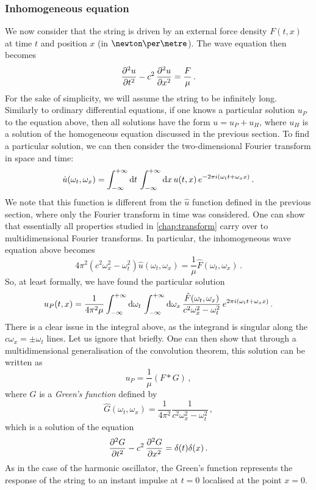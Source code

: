 \subsubsection{Inhomogeneous equation}
We now consider that the string is driven by an external force density $F(t,x)$ at time
$t$ and position $x$ (in $\newton\per\metre$). The wave equation then becomes
\begin{equation}
  \frac{\partial^{2} u}{\partial t^{2}}-c^2\,\frac{\partial^{2} u}{\partial x^{2}}=\frac{F}{\mu}\,.
\end{equation}
For the sake of simplicity, we will assume the string to be infinitely long.
Similarly to ordinary differential equations, if one knows a particular solution $u_P$ to
the equation above, then all solutions have the form $u=u_P+u_H$, where $u_H$ is a
solution of the homogeneous equation discussed in the previous section. To find a
particular solution, we can then consider the two-dimensional Fourier transform in space
and time:
\begin{equation}
  \hat{u}(\omega_t,\omega_x)=\int_{-\infty}^{+\infty}\mathrm{d}{t}\,\int_{-\infty}^{+\infty}\mathrm{d}{x}\,
  u(t,x)\,e^{-2\pi i (\omega_tt+\omega_xx)}\,.
\end{equation}
We note that this function is different from the $\hat{u}$ function defined in the
previous section, where only the Fourier transform in time was considered. One can show
that essentially all properties studied in \cref{chap:transform} carry over to
multidimensional Fourier transforms. In particular, the inhomogeneous wave equation above
becomes
\begin{equation}
  4\pi^2(c^2\omega_x^2-\omega_t^2)\hat{u}(\omega_t,\omega_x)=\frac{1}{\mu}
  \hat{F}(\omega_t,\omega_x)\,.
\end{equation}
So, at least formally, we have found the particular solution
\begin{equation}
  u_P(t,x)=\frac{1}{4\pi^2\mu}\int_{-\infty}^{+\infty}\mathrm{d}{\omega_t}\,\int_{-\infty}^{+\infty}\mathrm{d}{\omega_x}\,
  \frac{\hat{F}(\omega_t,\omega_x)}{c^2\omega_x^2-\omega_t^2}
  \,e^{2\pi i (\omega_tt+\omega_xx)}\,.\label{eq:wave-eq-up}
\end{equation}
There is a clear issue in the integral above, as the integrand is singular along the
$c\omega_x=\pm\omega_t$ lines. Let us ignore that briefly. One can then show that through
a multidimensional generalisation of the convolution theorem, this solution can be written
as
\begin{equation}
  u_P=\frac{1}{\mu}(F\ast G)\,,
\end{equation}
where $G$ is a \emph{Green's function} defined by
\begin{equation}
  \hat{G}(\omega_t,\omega_x)=\frac{1}{4\pi^2}\frac{1}{c^2\omega_x^2-\omega_t^2}\,,
\end{equation}
which is a solution of the equation
\begin{equation}
  \frac{\partial^{2} G}{\partial t^{2}}-c^2\,\frac{\partial^{2} G}{\partial x^{2}}=\delta(t)\delta(x)\,.
\end{equation}
As in the case of the harmonic oscillator, the Green's function represents the response of
the string to an instant impulse at $t=0$ localised at the point $x=0$.

